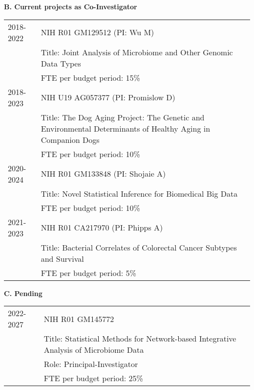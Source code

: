 \documentclass[10pt]{article}
\begin{document}
\textbf{B. Current projects as Co-Investigator}

\begin{table}[H]
\hskip0.9cm\begin{tabular}{p{1.6cm}p{12cm}}
2018-2022 & NIH R01 GM129512 (PI: Wu M)  \\
& Title: Joint Analysis of Microbiome and Other Genomic Data Types\\
& FTE per budget period: 15\%\\
2018-2023 & NIH U19 AG057377 (PI: Promislow D) \\
& Title: The Dog Aging Project: The Genetic and Environmental Determinants of Healthy Aging in Companion Dogs\\
& FTE per budget period: 10\%\\
2020-2024 & NIH R01 GM133848 (PI: Shojaie A) \\
& Title: Novel Statistical Inference for Biomedical Big Data\\
& FTE per budget period: 10\%\\
2021-2023 &  NIH R01 CA217970 (PI: Phipps A)\\
&Title: Bacterial Correlates of Colorectal Cancer Subtypes and Survival\\
& FTE per budget period: 5\%\\
\end{tabular}
\end{table}


\textbf{C. Pending}

\begin{table}[H]
\hskip0.9cm\begin{tabular}{p{1.6cm}p{12cm}}
2022-2027 & NIH R01 GM145772 \\
& Title: Statistical Methods for Network-based Integrative Analysis of Microbiome Data \\
& Role: Principal-Investigator\\
& FTE per budget period: 25\%
\end{tabular}
\end{table}
%
\end{document}
